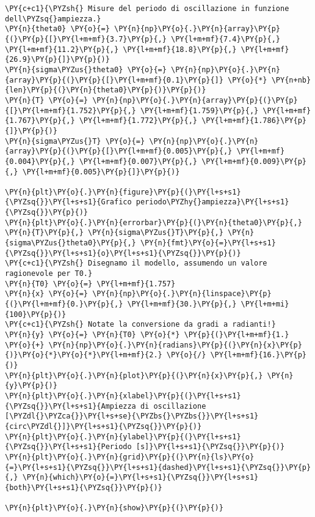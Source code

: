 \begin{Verbatim}[label=\makebox{\href{https://github.com/unipi-physics-labs/lab1-sheets/tree/main/snippy/pendolo_semplice.py}{https://github.com/.../pendolo\_semplice.py}},commandchars=\\\{\}]
\PY{c+c1}{\PYZsh{} Misure del periodo di oscillazione in funzione dell\PYZsq{}ampiezza.}
\PY{n}{theta0} \PY{o}{=} \PY{n}{np}\PY{o}{.}\PY{n}{array}\PY{p}{(}\PY{p}{[}\PY{l+m+mf}{3.7}\PY{p}{,} \PY{l+m+mf}{7.4}\PY{p}{,} \PY{l+m+mf}{11.2}\PY{p}{,} \PY{l+m+mf}{18.8}\PY{p}{,} \PY{l+m+mf}{26.9}\PY{p}{]}\PY{p}{)}
\PY{n}{sigma\PYZus{}theta0} \PY{o}{=} \PY{n}{np}\PY{o}{.}\PY{n}{array}\PY{p}{(}\PY{p}{[}\PY{l+m+mf}{0.1}\PY{p}{]} \PY{o}{*} \PY{n+nb}{len}\PY{p}{(}\PY{n}{theta0}\PY{p}{)}\PY{p}{)}
\PY{n}{T} \PY{o}{=} \PY{n}{np}\PY{o}{.}\PY{n}{array}\PY{p}{(}\PY{p}{[}\PY{l+m+mf}{1.752}\PY{p}{,} \PY{l+m+mf}{1.759}\PY{p}{,} \PY{l+m+mf}{1.767}\PY{p}{,} \PY{l+m+mf}{1.772}\PY{p}{,} \PY{l+m+mf}{1.786}\PY{p}{]}\PY{p}{)}
\PY{n}{sigma\PYZus{}T} \PY{o}{=} \PY{n}{np}\PY{o}{.}\PY{n}{array}\PY{p}{(}\PY{p}{[}\PY{l+m+mf}{0.005}\PY{p}{,} \PY{l+m+mf}{0.004}\PY{p}{,} \PY{l+m+mf}{0.007}\PY{p}{,} \PY{l+m+mf}{0.009}\PY{p}{,} \PY{l+m+mf}{0.005}\PY{p}{]}\PY{p}{)}

\PY{n}{plt}\PY{o}{.}\PY{n}{figure}\PY{p}{(}\PY{l+s+s1}{\PYZsq{}}\PY{l+s+s1}{Grafico periodo\PYZhy{}ampiezza}\PY{l+s+s1}{\PYZsq{}}\PY{p}{)}
\PY{n}{plt}\PY{o}{.}\PY{n}{errorbar}\PY{p}{(}\PY{n}{theta0}\PY{p}{,} \PY{n}{T}\PY{p}{,} \PY{n}{sigma\PYZus{}T}\PY{p}{,} \PY{n}{sigma\PYZus{}theta0}\PY{p}{,} \PY{n}{fmt}\PY{o}{=}\PY{l+s+s1}{\PYZsq{}}\PY{l+s+s1}{o}\PY{l+s+s1}{\PYZsq{}}\PY{p}{)}
\PY{c+c1}{\PYZsh{} Disegnamo il modello, assumendo un valore ragionevole per T0.}
\PY{n}{T0} \PY{o}{=} \PY{l+m+mf}{1.757}
\PY{n}{x} \PY{o}{=} \PY{n}{np}\PY{o}{.}\PY{n}{linspace}\PY{p}{(}\PY{l+m+mf}{0.}\PY{p}{,} \PY{l+m+mf}{30.}\PY{p}{,} \PY{l+m+mi}{100}\PY{p}{)}
\PY{c+c1}{\PYZsh{} Notate la conversione da gradi a radianti!}
\PY{n}{y} \PY{o}{=} \PY{n}{T0} \PY{o}{*} \PY{p}{(}\PY{l+m+mf}{1.} \PY{o}{+} \PY{n}{np}\PY{o}{.}\PY{n}{radians}\PY{p}{(}\PY{n}{x}\PY{p}{)}\PY{o}{*}\PY{o}{*}\PY{l+m+mf}{2.} \PY{o}{/} \PY{l+m+mf}{16.}\PY{p}{)}
\PY{n}{plt}\PY{o}{.}\PY{n}{plot}\PY{p}{(}\PY{n}{x}\PY{p}{,} \PY{n}{y}\PY{p}{)}
\PY{n}{plt}\PY{o}{.}\PY{n}{xlabel}\PY{p}{(}\PY{l+s+s1}{\PYZsq{}}\PY{l+s+s1}{Ampiezza di oscillazione [\PYZdl{}\PYZca{}}\PY{l+s+se}{\PYZbs{}\PYZbs{}}\PY{l+s+s1}{circ\PYZdl{}]}\PY{l+s+s1}{\PYZsq{}}\PY{p}{)}
\PY{n}{plt}\PY{o}{.}\PY{n}{ylabel}\PY{p}{(}\PY{l+s+s1}{\PYZsq{}}\PY{l+s+s1}{Periodo [s]}\PY{l+s+s1}{\PYZsq{}}\PY{p}{)}
\PY{n}{plt}\PY{o}{.}\PY{n}{grid}\PY{p}{(}\PY{n}{ls}\PY{o}{=}\PY{l+s+s1}{\PYZsq{}}\PY{l+s+s1}{dashed}\PY{l+s+s1}{\PYZsq{}}\PY{p}{,} \PY{n}{which}\PY{o}{=}\PY{l+s+s1}{\PYZsq{}}\PY{l+s+s1}{both}\PY{l+s+s1}{\PYZsq{}}\PY{p}{)}

\PY{n}{plt}\PY{o}{.}\PY{n}{show}\PY{p}{(}\PY{p}{)}
\end{Verbatim}
